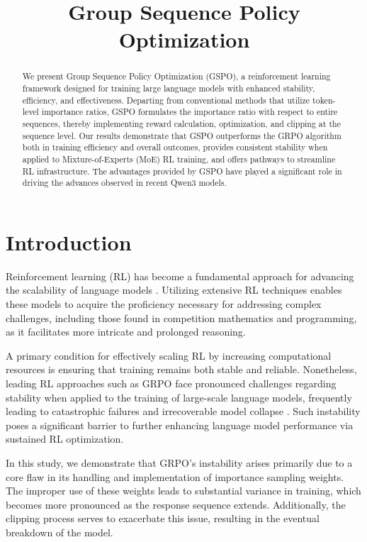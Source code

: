 \title{Group Sequence Policy Optimization}

\begin{abstract}
We present Group Sequence Policy Optimization (GSPO), a reinforcement learning framework designed for training large language models with enhanced stability, efficiency, and effectiveness. Departing from conventional methods that utilize token-level importance ratios, GSPO formulates the importance ratio with respect to entire sequences, thereby implementing reward calculation, optimization, and clipping at the sequence level. Our results demonstrate that GSPO outperforms the GRPO algorithm both in training efficiency and overall outcomes, provides consistent stability when applied to Mixture-of-Experts (MoE) RL training, and offers pathways to streamline RL infrastructure. The advantages provided by GSPO have played a significant role in driving the advances observed in recent Qwen3 models.
\end{abstract}

\section{Introduction}
\label{sec:intro}

Reinforcement learning (RL) has become a fundamental approach for advancing the scalability of language models \citep{o1,dpsk-r1,qwq32b,qwen3}. Utilizing extensive RL techniques enables these models to acquire the proficiency necessary for addressing complex challenges, including those found in competition mathematics and programming, as it facilitates more intricate and prolonged reasoning.

A primary condition for effectively scaling RL by increasing computational resources is ensuring that training remains both stable and reliable. Nonetheless, leading RL approaches such as GRPO \citep{grpo} face pronounced challenges regarding stability when applied to the training of large-scale language models, frequently leading to catastrophic failures and irrecoverable model collapse \citep{qwen3, minimax-m1}. Such instability poses a significant barrier to further enhancing language model performance via sustained RL optimization.

In this study, we demonstrate that GRPO's instability arises primarily due to a core flaw in its handling and implementation of importance sampling weights. The improper use of these weights leads to substantial variance in training, which becomes more pronounced as the response sequence extends. Additionally, the clipping process serves to exacerbate this issue, resulting in the eventual breakdown of the model.

